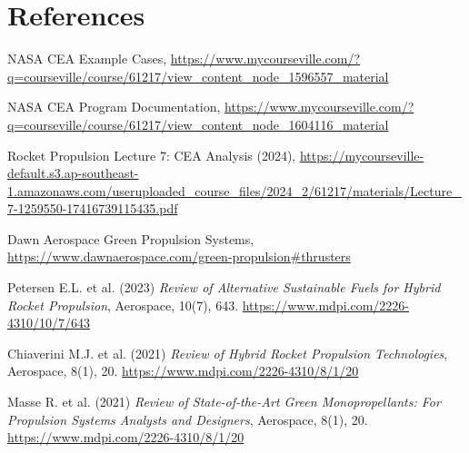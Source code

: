 \documentclass[12pt]{article}
\begin{document}
\section{References}
\begin{thebibliography}{9}
NASA CEA Example Cases, \url{https://www.mycourseville.com/?q=courseville/course/61217/view_content_node_1596557_material}

NASA CEA Program Documentation, \url{https://www.mycourseville.com/?q=courseville/course/61217/view_content_node_1604116_material}

Rocket Propulsion Lecture 7: CEA Analysis (2024), \url{https://mycourseville-default.s3.ap-southeast-1.amazonaws.com/useruploaded_course_files/2024_2/61217/materials/Lecture_7-1259550-17416739115435.pdf}

Dawn Aerospace Green Propulsion Systems, \url{https://www.dawnaerospace.com/green-propulsion#thrusters}

Petersen E.L. et al. (2023) \emph{Review of Alternative Sustainable Fuels for Hybrid Rocket Propulsion}, Aerospace, 10(7), 643. \url{https://www.mdpi.com/2226-4310/10/7/643}

Chiaverini M.J. et al. (2021) \emph{Review of Hybrid Rocket Propulsion Technologies}, Aerospace, 8(1), 20. \url{https://www.mdpi.com/2226-4310/8/1/20}

Masse R. et al. (2021) \emph{Review of State-of-the-Art Green Monopropellants: For Propulsion Systems Analysts and Designers}, Aerospace, 8(1), 20. \url{https://www.mdpi.com/2226-4310/8/1/20}
\end{thebibliography}
\end{document}
